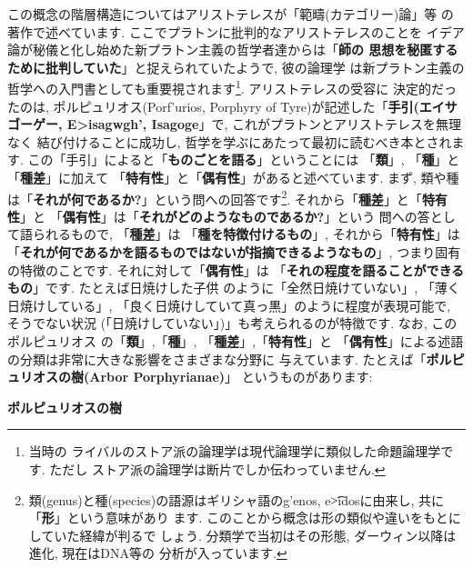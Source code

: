 \documentclass[b5j,8pt,twocolumn]{ltjsarticle}
\newcommand{\textgreek}[1]{\begingroup\fontencoding{LGR}\selectfont#1\endgroup}
\newcommand{\textgreek}[1]{\begingroup\fontencoding{LGR}\selectfont#1\endgroup}
\begin{document}
この概念の階層構造についてはアリストテレスが「範疇(カテゴリー)論」等
の著作で述べています. ここでプラトンに批判的なアリストテレスのことを
イデア論が秘儀と化し始めた新プラトン主義の哲学者達からは「\textbf{師の
思想を秘匿するために批判していた}」と捉えられていたようで, 彼の論理学
は新プラトン主義の哲学への入門書としても重要視されます\footnote{当時の
ライバルのストア派の論理学は現代論理学に類似した命題論理学です. ただし
ストア派の論理学は断片でしか伝わっていません.}. アリストテレスの受容に
決定的だったのは, ポルピュリオス(\textgreek{Porf'urios}, Porphyry of
 Tyre)が記述した「\textbf{手引(エイサゴーゲー, \textgreek{E>isagwgh'},
 Isagoge\cite{Barnes}}」で, これがプラトンとアリストテレスを無理なく
結び付けることに成功し, 哲学を学ぶにあたって最初に読むべき本とされます.
 この「手引」によると「\textbf{ものごとを語る}」ということには
「\textbf{類}」, 「\textbf{種}」と「\textbf{種差}」に加えて
「\textbf{特有性}」と「\textbf{偶有性}」があると述べています. まず,
 類や種は「\textbf{それが何であるか?}」という問への回答です\footnote{
類(genus)と種(species)の語源はギリシャ語の\textgreek{g'enos}, 
 \textgreek{e\t{>i}dos}に由来し, 共に「\textbf{形}」という意味があり
ます. このことから概念は形の類似や違いをもとにしていた経緯が判るで
しょう. 分類学で当初はその形態, ダーウィン以降は進化, 現在はDNA等の
分析が入っています.}. それから「\textbf{種差}」と「\textbf{特有性}」と
「\textbf{偶有性}」は「\textbf{それがどのようなものであるか?}」という
問への答として語られるもので, 「\textbf{種差}」は
「\textbf{種を特徴付けるもの}」, それから「\textbf{特有性}」は
「\textbf{それが何であるかを語るものではないが指摘できるようなもの}」,
 つまり固有の特徴のことです. それに対して「\textbf{偶有性}」は
「\textbf{それの程度を語ることができるもの}」です. たとえば日焼けした子供
のように「全然日焼けていない」, 「薄く日焼けしている」, 
「良く日焼けしていて真っ黒」のように程度が表現可能で, そうでない状況
(「日焼けしていない」)」も考えられるのが特徴です. なお, このポルピュリオス
の「\textbf{類}」,「\textbf{種}」, 「\textbf{種差}」,「\textbf{特有性}」と
「\textbf{偶有性}」による述語の分類は非常に大きな影響をさまざまな分野に
与えています. たとえば「\textbf{ポルピュリオスの樹(Arbor Porphyrianae)}」
というものがあります:


\begin{itembox}[c]{\textbf{ポルピュリオスの樹}}
{\tiny
{}
}
\end{itembox}
\end{document}
